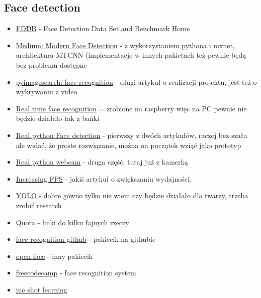 \documentclass[a4paper]{mwart}
\begin{document}
\subsection{Face detection}
\begin{itemize}
	\item \href{http://vis-www.cs.umass.edu/fddb/}{FDDB} - Face Detection Data Set and Benchmark Home
	\item \href{https://medium.com/wassa/modern-face-detection-based-on-deep-learning-using-python-and-mxnet-5e6377f22674}{Medium: Modern Face Detection} - z wykorzystaniem pythona i mxnet, architektura MTCNN (implementacje w innych pakietach też pewnie będą bez problemu dostępne
	\item \href{https://www.pyimagesearch.com/2018/06/18/face-recognition-with-opencv-python-and-deep-learning/}{pyimagesearch: face recognition} - długi artykuł o realizacji projektu, jest też o wykrywaniu z video
	\item \href{https://www.hackster.io/mjrobot/real-time-face-recognition-an-end-to-end-project-a10826}{Real time face recognition} = zrobione na raspberry więc na PC pewnie nie będzie działało tak z bańki
	\item \href{https://realpython.com/face-recognition-with-python/}{Real python Face detection} - pierwszy z dwóch artykułów, raczej bez szału ale widać, że proste rozwiązanie, można na początek wziąć jako prototyp
	\item \href{https://realpython.com/face-detection-in-python-using-a-webcam/}{Real python webcam} - druga część, tutaj już z kamerką
	\item \href{https://www.pyimagesearch.com/2015/12/21/increasing-webcam-fps-with-python-and-opencv/}{Increasing FPS} - jakiś artykuł o zwiększaniu wydajności.
	\item \href{https://pjreddie.com/darknet/yolo/}{YOLO} - dobre gówno tylko nie wiem czy będzie działało dla twarzy, trzeba zrobić research
	\item \href{https://www.quora.com/Which-library-is-best-for-face-recognition-from-a-real-time-video-language-Python}{Quora} - linki do kilku fajnych rzeczy
	\item \href{https://github.com/ageitgey/face_recognition}{face recognition github} - pakiecik na githubie
	\item \href{https://github.com/cmusatyalab/openface}{open face} - inny pakiecik
	\item \href{https://medium.freecodecamp.org/making-your-own-face-recognition-system-29a8e728107c}{freecodecamp} - face recognition system
	\item \href{https://towardsdatascience.com/one-shot-learning-face-recognition-using-siamese-neural-network-a13dcf739e}{ine shot learning}
\end{itemize}
\end{document}
